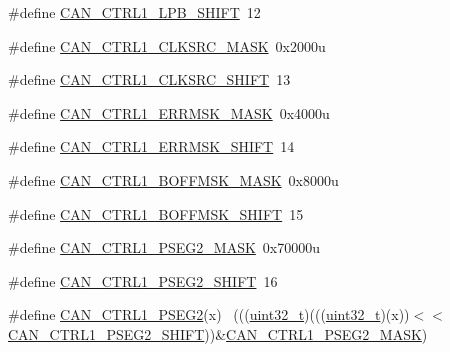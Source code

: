 \begin{DoxyCompactItemize}
\item 
\#define \hyperlink{group___c_a_n___register___masks_ga61cd46b497234d979cda54fa0952b848}{C\+A\+N\+\_\+\+C\+T\+R\+L1\+\_\+\+L\+P\+B\+\_\+\+S\+H\+I\+FT}~12
\item 
\#define \hyperlink{group___c_a_n___register___masks_ga24eac1a19c79f750c2ed88506155179d}{C\+A\+N\+\_\+\+C\+T\+R\+L1\+\_\+\+C\+L\+K\+S\+R\+C\+\_\+\+M\+A\+SK}~0x2000u
\item 
\#define \hyperlink{group___c_a_n___register___masks_gaba9b9a37df4f732cbd5b994aafe50eed}{C\+A\+N\+\_\+\+C\+T\+R\+L1\+\_\+\+C\+L\+K\+S\+R\+C\+\_\+\+S\+H\+I\+FT}~13
\item 
\#define \hyperlink{group___c_a_n___register___masks_ga108c8ae37e8122ea29d48b9e68fbcc43}{C\+A\+N\+\_\+\+C\+T\+R\+L1\+\_\+\+E\+R\+R\+M\+S\+K\+\_\+\+M\+A\+SK}~0x4000u
\item 
\#define \hyperlink{group___c_a_n___register___masks_ga16b53de26664898f76f1cd545181782b}{C\+A\+N\+\_\+\+C\+T\+R\+L1\+\_\+\+E\+R\+R\+M\+S\+K\+\_\+\+S\+H\+I\+FT}~14
\item 
\#define \hyperlink{group___c_a_n___register___masks_gafda1924bc397205b585b128187af9634}{C\+A\+N\+\_\+\+C\+T\+R\+L1\+\_\+\+B\+O\+F\+F\+M\+S\+K\+\_\+\+M\+A\+SK}~0x8000u
\item 
\#define \hyperlink{group___c_a_n___register___masks_ga9f3df553dda57c9cb36c599ee20bc598}{C\+A\+N\+\_\+\+C\+T\+R\+L1\+\_\+\+B\+O\+F\+F\+M\+S\+K\+\_\+\+S\+H\+I\+FT}~15
\item 
\#define \hyperlink{group___c_a_n___register___masks_ga204a1f6435e791f02d599543020b4b15}{C\+A\+N\+\_\+\+C\+T\+R\+L1\+\_\+\+P\+S\+E\+G2\+\_\+\+M\+A\+SK}~0x70000u
\item 
\#define \hyperlink{group___c_a_n___register___masks_ga667a8faa98245aa9fa5afc6e71b7f640}{C\+A\+N\+\_\+\+C\+T\+R\+L1\+\_\+\+P\+S\+E\+G2\+\_\+\+S\+H\+I\+FT}~16
\item 
\#define \hyperlink{group___c_a_n___register___masks_gaca5a6aa4c0a109e51dc0b26f59b840a4}{C\+A\+N\+\_\+\+C\+T\+R\+L1\+\_\+\+P\+S\+E\+G2}(x)                                          ~(((\hyperlink{_p_e___types_8h_a33594304e786b158f3fb30289278f5af}{uint32\+\_\+t})(((\hyperlink{_p_e___types_8h_a33594304e786b158f3fb30289278f5af}{uint32\+\_\+t})(x))$<$$<$\hyperlink{group___c_a_n___register___masks_ga667a8faa98245aa9fa5afc6e71b7f640}{C\+A\+N\+\_\+\+C\+T\+R\+L1\+\_\+\+P\+S\+E\+G2\+\_\+\+S\+H\+I\+FT}))\&\hyperlink{group___c_a_n___register___masks_ga204a1f6435e791f02d599543020b4b15}{C\+A\+N\+\_\+\+C\+T\+R\+L1\+\_\+\+P\+S\+E\+G2\+\_\+\+M\+A\+SK})
\item 
$$
\end{DoxyCompactItemize}
